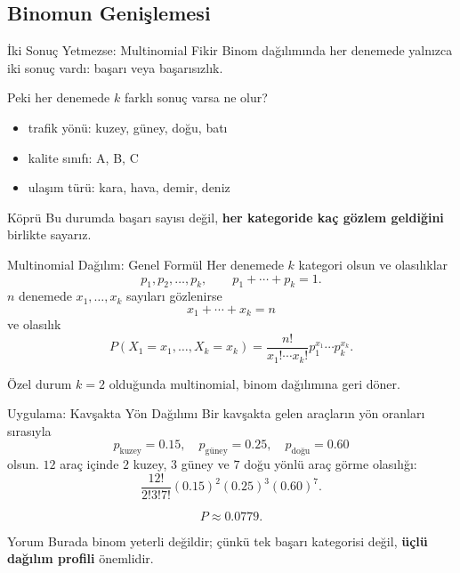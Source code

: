 \documentclass[light]{lutbeamer}
\begin{document}
\subsection{Binomun Genişlemesi}

\begin{frame}{İki Sonuç Yetmezse: Multinomial Fikir}
    \small
    Binom dağılımında her denemede yalnızca iki sonuç vardı: başarı veya başarısızlık.

    \vspace{0.2cm}
    Peki her denemede \(k\) farklı sonuç varsa ne olur?

    \begin{itemize}
        \item trafik yönü: kuzey, güney, doğu, batı
        \item kalite sınıfı: A, B, C
        \item ulaşım türü: kara, hava, demir, deniz
    \end{itemize}

    \begin{alertblock}{Köprü}
        Bu durumda başarı sayısı değil, \textbf{her kategoride kaç gözlem geldiğini} birlikte sayarız.
    \end{alertblock}
\end{frame}

\begin{frame}{Multinomial Dağılım: Genel Formül}
    \small
    Her denemede \(k\) kategori olsun ve olasılıklar
    \[
    p_1,p_2,\dots,p_k, \qquad p_1+\cdots+p_k=1.
    \]
    \(n\) denemede \(x_1,\dots,x_k\) sayıları gözlenirse
    \[
    x_1+\cdots+x_k=n
    \]
    ve olasılık
    \[
    P(X_1=x_1,\dots,X_k=x_k)=
    \frac{n!}{x_1!\cdots x_k!}p_1^{x_1}\cdots p_k^{x_k}.
    \]

    \begin{block}{Özel durum}
        \(k=2\) olduğunda multinomial, binom dağılımına geri döner.
    \end{block}
\end{frame}

\begin{frame}{Uygulama: Kavşakta Yön Dağılımı}
    \small
    Bir kavşakta gelen araçların yön oranları sırasıyla
    \[
    p_{\text{kuzey}}=0.15,\quad p_{\text{güney}}=0.25,\quad p_{\text{doğu}}=0.60
    \]
    olsun. \(12\) araç içinde \(2\) kuzey, \(3\) güney ve \(7\) doğu yönlü araç görme olasılığı:
    \[
    \frac{12!}{2!3!7!}(0.15)^2(0.25)^3(0.60)^7.
    \]

    \[
    P\approx 0.0779.
    \]

    \begin{exampleblock}{Yorum}
        Burada binom yeterli değildir; çünkü tek başarı kategorisi değil, \textbf{üçlü dağılım profili} önemlidir.
    \end{exampleblock}
\end{frame}
\end{document}
